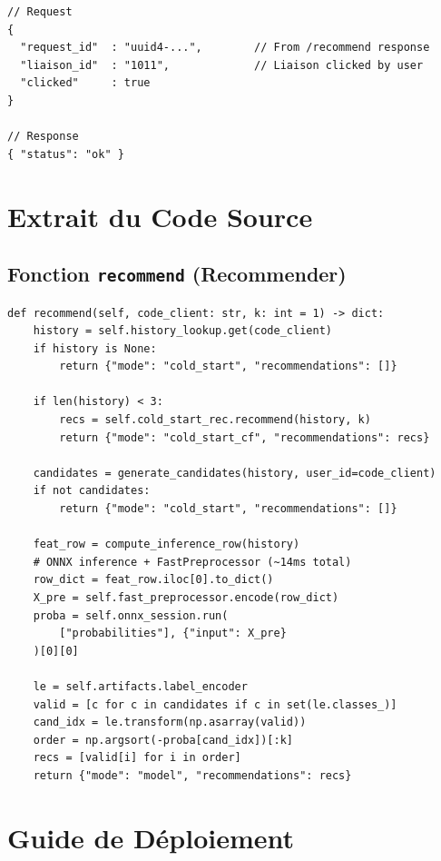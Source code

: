 \documentclass[12pt, a4paper]{report}
\begin{document}
\begin{lstlisting}[style=json, caption={Sch\'ema de requ\^ete /feedback}]
// Request
{
  "request_id"  : "uuid4-...",        // From /recommend response
  "liaison_id"  : "1011",             // Liaison clicked by user
  "clicked"     : true
}

// Response
{ "status": "ok" }
\end{lstlisting}

\chapter{Extrait du Code Source}

\section{Fonction \texttt{recommend} (Recommender)}

\begin{lstlisting}[style=python, caption={Logique principale de recommandation}]
def recommend(self, code_client: str, k: int = 1) -> dict:
    history = self.history_lookup.get(code_client)
    if history is None:
        return {"mode": "cold_start", "recommendations": []}

    if len(history) < 3:
        recs = self.cold_start_rec.recommend(history, k)
        return {"mode": "cold_start_cf", "recommendations": recs}

    candidates = generate_candidates(history, user_id=code_client)
    if not candidates:
        return {"mode": "cold_start", "recommendations": []}

    feat_row = compute_inference_row(history)
    # ONNX inference + FastPreprocessor (~14ms total)
    row_dict = feat_row.iloc[0].to_dict()
    X_pre = self.fast_preprocessor.encode(row_dict)
    proba = self.onnx_session.run(
        ["probabilities"], {"input": X_pre}
    )[0][0]

    le = self.artifacts.label_encoder
    valid = [c for c in candidates if c in set(le.classes_)]
    cand_idx = le.transform(np.asarray(valid))
    order = np.argsort(-proba[cand_idx])[:k]
    recs = [valid[i] for i in order]
    return {"mode": "model", "recommendations": recs}
\end{lstlisting}

\chapter{Guide de Déploiement}
\label{ann:guide-deploiement}
\end{document}
